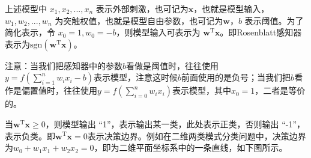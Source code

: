 \documentclass[11pt]{article}
\begin{document}
    上述模型中 \(x_1, x_2,...,x_n\)
表示外部刺激，也可记为\(\mathbf x\)，也就是模型输入，\(w_1, w_2,..., w_n\)
为突触权值，也就是模型自由参数，也可记为\(\mathbf w\)，\(b\)
表示阈值。为了简化表示，令 \(x_0 = 1, w_0=-b\)，则模型输入可表示为
\(\mathbf{w}^\mathrm{T}\mathbf{x}\)。即Rosenblatt感知器表示为\(\mathrm{sgn}(\mathbf{w}^\mathrm{T}\mathbf{x})\)。

注意：当我们把感知器中的参数\(b\)看做是阈值时，往往使用\(y=f\left(\sum_{i=1}^nw_ix_i-b\right)\)表示模型，注意这时候\(b\)前面使用的是负号；当我们把\(b\)看作是偏置值时，往往使用\(y=f\left(\sum_{i=0}^nw_ix_i\right)\)表示模型，其中\(x_0=1\)，二者是等价的。

    当\(\mathbf{w}^\mathrm{T}\mathbf{x}\geq 0\)，则模型输出
``1''，表示输出某一类，此处表示正类，否则输出
``-1''，表示负类。即\(\mathbf{w}^\mathrm{T}\mathbf{x}= 0\)表示决策边界。例如在二维两类模式分类问题中，决策边界为\(w_0+w_1x_1+w_2x_2=0\)，即为二维平面坐标系中的一条直线，如下图所示。
\end{document}
